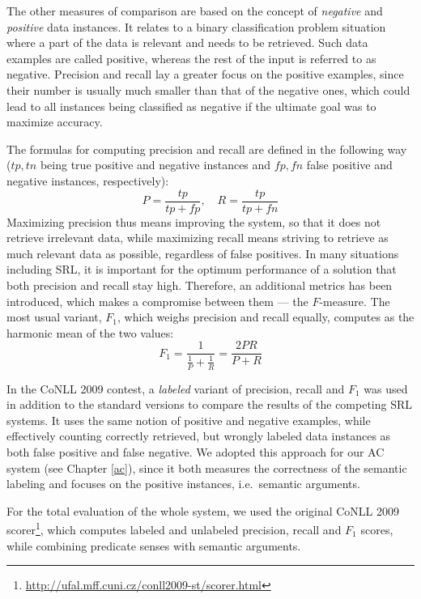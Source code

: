 \documentclass[12pt,notitlepage,a4paper]{report}
\begin{document}
The other measures of comparison are based on the concept of \emph{negative} and \emph{positive} data instances. It relates to a binary classification problem situation where a part of the data is relevant and needs to be retrieved. Such data examples are called positive, whereas the rest of the input is referred to as negative. Precision and recall lay a greater focus on the positive examples, since their number is usually much smaller than that of the negative ones, which could lead to all instances being classified as negative if the ultimate goal was to maximize accuracy.

The formulas for computing precision and recall are defined in the following way ($tp,tn$ being true positive and negative instances and $fp,fn$ false positive and negative instances, respectively):
\begin{equation}
P = \frac{tp}{tp + fp},\quad R = \frac{tp}{tp + fn}
\end{equation}
Maximizing precision thus means improving the system, so that it does not retrieve irrelevant data, while maximizing recall means striving to retrieve as much relevant data as possible, regardless of false positives. In many situations including SRL, it is important for the optimum performance of a solution that both precision and recall stay high. Therefore, an additional metrics has been introduced, which makes a compromise between them --- the $F$-measure. The most usual variant, $F_1$, which weighs precision and recall equally, computes as the harmonic mean of the two values:
\begin{equation}
F_1 = \frac{1}{\frac{1}{P} + \frac{1}{R}} = \frac{2PR}{P+R}
\end{equation}

In the CoNLL 2009 contest, a \emph{labeled} variant of precision, recall and $F_1$ \citep{hajic09} was used in addition to the standard versions to compare the results of the competing SRL systems. It uses the same notion of positive and negative examples, while effectively counting correctly retrieved, but wrongly labeled data instances as both false positive and false negative. We adopted this approach for our AC system (see Chapter \ref{ac}), since it both measures the correctness of the semantic labeling and focuses on the positive instances, i.e.\ semantic arguments.

For the total evaluation of the whole system, we used the original CoNLL 2009 scorer\footnote{\url{http://ufal.mff.cuni.cz/conll2009-st/scorer.html}}, which computes labeled and unlabeled precision, recall and $F_1$ scores, while combining predicate senses with semantic arguments.
\end{document}
